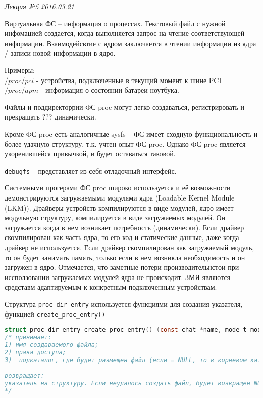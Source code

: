 \clearpage
\begin{flushright}
	\textit{Лекция №5}
	\textit{2016.03.21}
\end{flushright}

Виртуальная ФС – информация о процессах. Текстовый файл с нужной инфомацией создается, когда выполняется запрос на чтение соответствующей информации.
Взаимодейсвтие с ядром заключается в чтении информации из ядра / записи новой информации в ядро.

Примеры:\\
$/proc/pci$ - устройства, подключенные в текущий момент к шине PCI\\
$/proc/apm$ - информация о состоянии батареи ноутбука.

Файлы и поддиректоррии ФС proc могут легко создаваться, регистрировать и прекращать ??? динамически. 

Кроме ФС proc есть аналогичные sysfs – ФС имеет сходную функциональность и более удачную структуру, т.к. учтен опыт ФС  proc. Однако ФС proc является укоренившейся привычкой, и будет оставаться таковой.

\verb|debugfs| – представляет из себя отладочный интерфейс.

Системными прогерами ФС proc широко используется и её возможности демонстрируются загружаемыми модулями ядра (Loadable Kernel Module (LKM)).
Драйверы устройств компилируются в виде модулей, ядро имеет модульную структуру, компилируется в виде загружаемых модулей. Он загружается когда в нем возникает потребность (динамически). Если драйвер скомпилирован как часть ядра, то его код и статические данные, даже когда драйвер не используется. Если драйвер скомпилирован как загружаемый модуль, то он будет занимать память, только если в нем возникла необходимость и он загружен в ядро. Отмечается, что заметные потери производительнстои при иссползовании загружаемых модулей ядра не происходит. ЗМЯ являются средставм адаптируемым к конкретным подключенным устройствам. 

 

Структура \verb|proc_dir_entry| используется функциями для создания указателя, функцией \verb|create_proc_entry()|

\begin{lstlisting}[language=c]
struct proc_dir_entry create_proc_entry() (const chat *name, mode_t mode, struct proc_dir_entry *base);
/* принимает:
1) имя создаваемого файла;
2) права доступа;
3)  подкаталог, где будет размещен файл (если = NULL, то в корневом каталоге proc); 

возвращает:
указатель на структуру. Если неудалось создать файл, будет возвращен NULL.
*/
\end{lstlisting}

